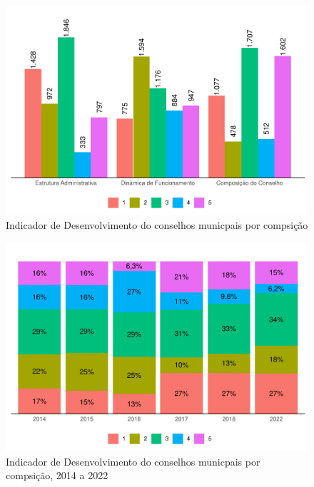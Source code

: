 \documentclass[
  brazilian]{report}
\begin{document}
\begin{figure}
\includegraphics{Censo-SUAS-2022_files/figure-latex/idcon-1} \caption[Indicador de Desenvolvimento do conselhos municpais por compsição]{Indicador de Desenvolvimento do conselhos municpais por compsição}\label{fig:idcon}
\end{figure}

\begin{figure}
\includegraphics{Censo-SUAS-2022_files/figure-latex/Id_per-1} \caption[Indicador de Desenvolvimento do conselhos municpais por compsição, 2014 a 2022]{Indicador de Desenvolvimento do conselhos municpais por compsição, 2014 a 2022}\label{fig:Id_per}
\end{figure}
\end{document}
